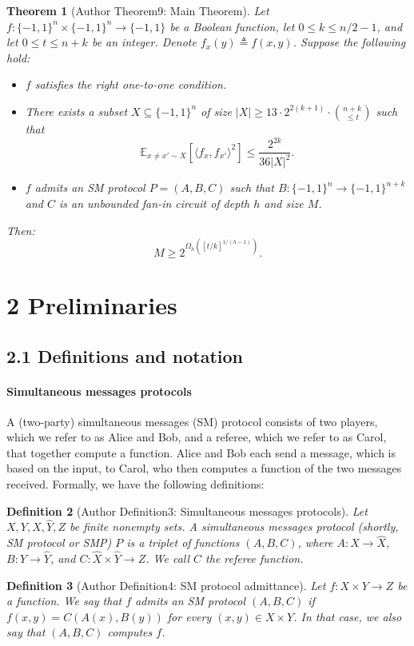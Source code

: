 \documentclass[10pt,a4paper]{article}
\newtheorem{nttheorem}{Theorem}
\newtheorem{ntdefinition}[nttheorem]{Definition}
\begin{document}
\setcounter{nttheorem}{8}
\begin{nttheorem}[Author Theorem9: Main Theorem]
Let $f:\{-1,1\}^n\times\{-1,1\}^n\to\{-1,1\}$ be a Boolean function, let $0\leq k\leq n/2-1$, and let $0\leq t\leq n+k$ be an integer. Denote $f_x(y)\triangleq f(x,y)$. Suppose the following hold:
\begin{itemize}
\item $f$ satisfies the right one-to-one condition.
\item There exists a subset $X\subseteq\{-1,1\}^n$ of size $|X|\geq13\cdot2^{2(k+1)}\cdot\binom{n+k}{\leq t}$ such that
\[\mathbb E_{x\ne x'\sim X}[\langle f_x,f_{x'}\rangle^2]\leq\frac{2^{2k}}{36|X|^2}.\]
\item $f$ admits an SM protocol $P=(A,B,C)$ such that $B:\{-1,1\}^n\to\{-1,1\}^{n+k}$ and $C$ is an unbounded fan-in circuit of depth $h$ and size $M$.
\end{itemize}
Then:
\[M\geq2^{\Omega_h([t/k]^{1/(h-1)})}.\]
\end{nttheorem}

\section*{2 Preliminaries}
\subsection*{2.1 Definitions and notation}
\paragraph{Simultaneous messages protocols}
A (two-party) simultaneous messages (SM) protocol consists of two players, which we refer to as Alice and Bob, and a referee, which we refer to as Carol, that together compute a function. Alice and Bob each send a message, which is based on the input, to Carol, who then computes a function of the two messages received. Formally, we have the following definitions:
\setcounter{nttheorem}{2}
\begin{ntdefinition}[Author Definition3: Simultaneous messages protocols]
Let $X,Y,\widehat X,\widehat Y,Z$ be finite nonempty sets. A simultaneous messages protocol (shortly, SM protocol or SMP) $P$ is a triplet of functions $(A,B,C)$, where $A:X\to\widehat X$, $B:Y\to\widehat Y$, and $C:\widehat X\times\widehat Y\to Z$. We call $C$ the referee function.
\end{ntdefinition}
\begin{ntdefinition}[Author Definition4: SM protocol admittance]
Let $f:X\times Y\to Z$ be a function. We say that $f$ admits an SM protocol $(A,B,C)$ if $f(x,y)=C(A(x),B(y))$ for every $(x,y)\in X\times Y$. In that case, we also say that $(A,B,C)$ computes $f$.
\end{ntdefinition}
\end{document}

